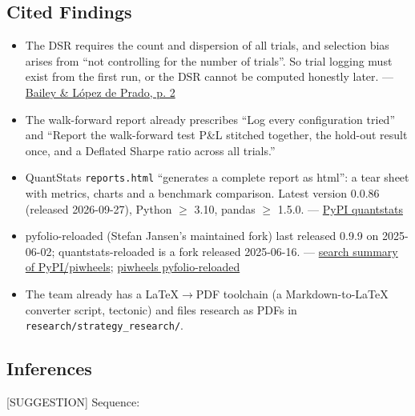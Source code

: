 \documentclass{article}
\begin{document}
\subsection{Cited Findings}

\begin{itemize}

\item The DSR requires the count and dispersion of all trials, and selection bias arises from ``not controlling for the number of trials''. So trial logging must exist from the first run, or the DSR cannot be computed honestly later. --- \href{https://www.davidhbailey.com/dhbpapers/deflated-sharpe.pdf}{Bailey \& López de Prado, p. 2}

\item [REPO] The walk-forward report already prescribes ``Log every configuration tried'' and ``Report the walk-forward test P\&L stitched together, the hold-out result once, and a Deflated Sharpe ratio across all trials.''

\item QuantStats \texttt{reports.\allowbreak{}html} ``generates a complete report as html'': a tear sheet with metrics, charts and a benchmark comparison. Latest version 0.0.86 (released 2026-09-27), Python \ensuremath{\geq} 3.10, pandas \ensuremath{\geq} 1.5.0. --- \href{https://pypi.org/project/quantstats/}{PyPI quantstats}

\item pyfolio-reloaded (Stefan Jansen's maintained fork) last released 0.9.9 on 2025-06-02; quantstats-reloaded is a fork released 2025-06-16. --- \href{https://pypi.org/project/quantstats-reloaded/}{search summary of PyPI/\allowbreak{}piwheels}; \href{https://www.piwheels.org/project/pyfolio-reloaded/}{piwheels pyfolio-reloaded}

\item [REPO] The team already has a LaTeX\ensuremath{\rightarrow}PDF toolchain (a Markdown-to-LaTeX converter script, tectonic) and files research as PDFs in \texttt{research/\allowbreak{}strategy\_\allowbreak{}research/\allowbreak{}}.

\end{itemize}

\subsection{Inferences}

[SUGGESTION] Sequence:
\end{document}

